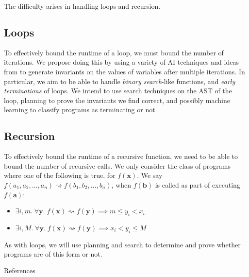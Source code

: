 \documentclass{mfcs}
\begin{document}
The difficulty arises in handling loops and recursion.

{\color{colour}\subsection{Loops}}

To effectively bound the runtime of a loop, we must bound the number of
iterations. We propose doing this by using a variety of AI techniques and ideas
from \cite{Zuleger:2011:BAI:2041552.2041574, Gulwani:2010:RP:1809028.1806630,
  Gulwani:2009:SSC:1575060.1575069} to generate invariants on the values of
variables after multiple iterations. In particular, we aim to be able to handle
\emph{binary search}-like functions, and \emph{early terminations} of loops. We
intend to use search techniques on the AST of the loop, planning to prove the
invariants we find correct, and possibly machine learning to classify programs
as terminating or not.

{\color{colour}\subsection{Recursion}}

To effectively bound the runtime of a recursive function, we need to be able to
bound the number of recursive calls. We only consider the class of programs
where one of the following is true, for $f(\textbf{x})$. We say $f(a_1, a_2,
\dots, a_n) \rightsquigarrow f(b_1, b_2, \dots, b_n)$, when $f(\textbf{b})$ is
called as part of executing $f(\textbf{a})$:
\begin{itemize}
\item $\exists i,m.\; \forall \textbf{y}.\; f(\textbf{x}) \rightsquigarrow
  f(\textbf{y}) \implies m \le y_i < x_i$
\item $\exists i,M.\; \forall \textbf{y}.\; f(\textbf{x}) \rightsquigarrow
  f(\textbf{y}) \implies x_i < y_i \le M$
\end{itemize}

As with loops, we will use planning and search to determine and prove whether
programs are of this form or not.


\begin{question}{References}
  \nocite{*}
  \printbibliography[heading=none]
\end{question}
\end{document}
